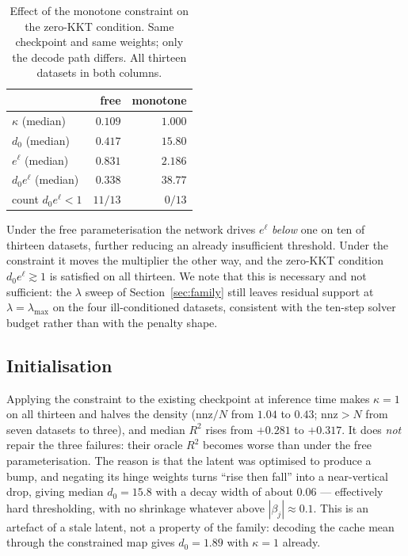 \documentclass[11pt]{article}
\begin{document}
\begin{table}[h]
\centering
\caption{Effect of the monotone constraint on the zero-KKT condition. Same
checkpoint and same weights; only the decode path differs. All thirteen
datasets in both columns.}
\label{tab:kkt}
\begin{tabular}{@{}lrr@{}}
\toprule
 & free & monotone \\
\midrule
$\kappa$ (median)        & $0.109$ & $1.000$ \\
$d_0$ (median)           & $0.417$ & $15.80$ \\
$e^{\ell}$ (median)      & $0.831$ & $2.186$ \\
$d_0 e^{\ell}$ (median)  & $0.338$ & $38.77$ \\
count $d_0 e^{\ell} < 1$ & $11/13$ & $0/13$ \\
\bottomrule
\end{tabular}
\end{table}

Under the free parameterisation the network drives $e^{\ell}$ \emph{below} one
on ten of thirteen datasets, further reducing an already insufficient threshold.
Under the constraint it moves the multiplier the other way, and the zero-KKT
condition $d_0 e^{\ell} \gtrsim 1$ is satisfied on all thirteen. We note that
this is necessary and not sufficient: the $\lambda$ sweep of
Section~\ref{sec:family} still leaves residual support at
$\lambda = \lambda_{\max}$ on the four ill-conditioned datasets, consistent
with the ten-step solver budget rather than with the penalty shape.

\subsection{Initialisation}

Applying the constraint to the existing checkpoint at inference time makes
$\kappa = 1$ on all thirteen and halves the density ($\mathrm{nnz}/N$ from
$1.04$ to $0.43$; $\mathrm{nnz} > N$ from seven datasets to three), and median
$R^2$ rises from $+0.281$ to $+0.317$. It does \emph{not} repair the three
failures: their oracle $R^2$ becomes worse than under the free
parameterisation. The reason is that the latent was optimised to produce a
bump, and negating its hinge weights turns ``rise then fall'' into a
near-vertical drop, giving median $d_0 = 15.8$ with a decay width of about
$0.06$ --- effectively hard thresholding, with no shrinkage whatever above
$|\beta_j| \approx 0.1$. This is an artefact of a stale latent, not a property
of the family: decoding the cache mean through the constrained map gives
$d_0 = 1.89$ with $\kappa = 1$ already.
\end{document}
